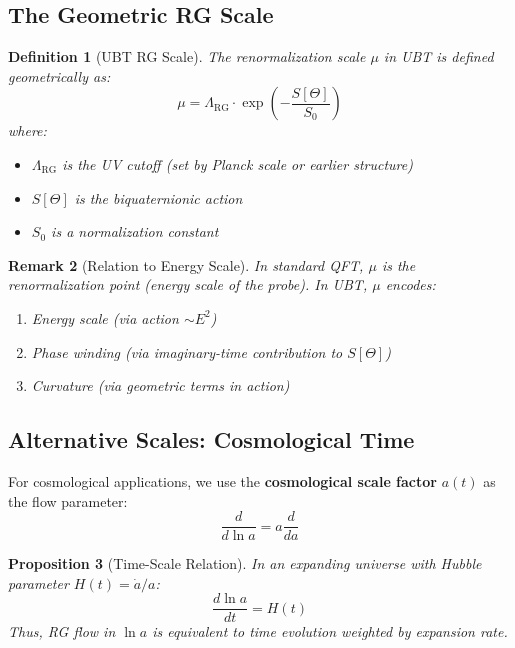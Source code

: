 \documentclass[12pt]{article}
\newtheorem{definition}{Definition}[section]
\newtheorem{proposition}[definition]{Proposition}
\newtheorem{remark}[definition]{Remark}
\newcommand{\RG}{\text{RG}}
\begin{document}
\subsection{The Geometric RG Scale}

\begin{definition}[UBT RG Scale]
The renormalization scale $\mu$ in UBT is defined geometrically as:
\begin{equation}
\mu = \Lambda_{\RG} \cdot \exp\left( -\frac{S[\Theta]}{S_0} \right)
\label{eq:scale_definition}
\end{equation}
where:
\begin{itemize}
    \item $\Lambda_{\RG}$ is the UV cutoff (set by Planck scale or earlier structure)
    \item $S[\Theta]$ is the biquaternionic action
    \item $S_0$ is a normalization constant
\end{itemize}
\end{definition}

\begin{remark}[Relation to Energy Scale]
In standard QFT, $\mu$ is the renormalization point (energy scale of the probe). In UBT, $\mu$ encodes:
\begin{enumerate}
    \item Energy scale (via action $\sim E^2$)
    \item Phase winding (via imaginary-time contribution to $S[\Theta]$)
    \item Curvature (via geometric terms in action)
\end{enumerate}
\end{remark}

\subsection{Alternative Scales: Cosmological Time}

For cosmological applications, we use the \textbf{cosmological scale factor} $a(t)$ as the flow parameter:
\begin{equation}
\frac{d}{d \ln a} = a \frac{d}{da}
\end{equation}

\begin{proposition}[Time-Scale Relation]
In an expanding universe with Hubble parameter $H(t) = \dot{a}/a$:
\begin{equation}
\frac{d \ln a}{dt} = H(t)
\end{equation}
Thus, RG flow in $\ln a$ is equivalent to time evolution weighted by expansion rate.
\end{proposition}
\end{document}
